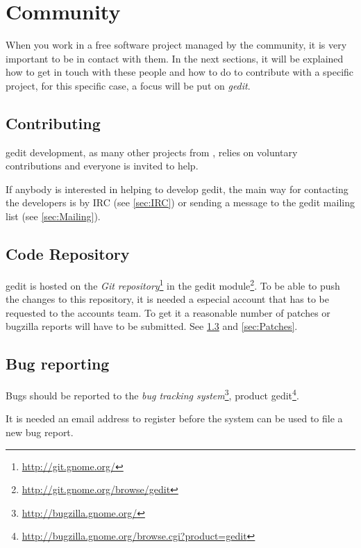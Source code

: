 
\chapter{Community}\label{chap:community}

When you work in a free software project managed by the community, it is very important to be in contact with them. In the next sections, it will be explained how to get in touch with these people and how to do to contribute with a specific project, for this specific case, a focus will be put on \emph{gedit}\cite{website:gedit}.

\section{Contributing}\label{sec:Contributing}

gedit development, as many other projects from \GNOME, relies on voluntary contributions and everyone is invited to help.

If anybody is interested in helping to develop gedit, the main way for contacting the developers is by IRC (see \ref{sec:IRC}) or sending a message to the gedit mailing list (see \ref{sec:Mailing}).

\section{Code Repository}\label{sec:Repository}

gedit is hosted on the \emph{\GNOME Git repository}\footnote{\url{http://git.gnome.org/}} in the gedit module\footnote{\url{http://git.gnome.org/browse/gedit}}. To be able to push the changes to this repository, it is needed a especial account that has to be requested to the \GNOME accounts team. To get it a reasonable number of patches or bugzilla reports will have to be submitted. See \ref{sec:Bugs} and \ref{sec:Patches}.

\section{Bug reporting}\label{sec:Bugs}

Bugs should be reported to the \emph{\GNOME bug tracking system}\footnote{\url{http://bugzilla.gnome.org/}}, product gedit\footnote{\url{http://bugzilla.gnome.org/browse.cgi?product=gedit}}.

It is needed an email address to register before the system can be used to file a new bug report.

